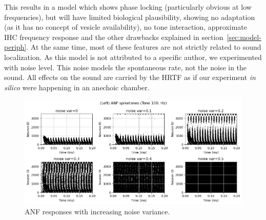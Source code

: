 \documentclass[11pt,a4paper]{article}
\newcommand{\parspace}{\vspace{7pt}}
\begin{document}
\parspace
This results in a model which shows phase locking (particularly obvious at low frequencies), but will have limited biological plausibility, showing no adaptation (as it has no concept of vesicle availability), no tone interaction, approximate IHC frequency response and the other drawbacks explained in section~\ref{sec:model-periph}. At the same time, most of these features are not strictly related to sound localization. As this model is not attributed to a specific author, we experimented with noise level. This noise models the spontaneous rate, not the noise in the sound. All effects on the sound are carried by the HRTF as if our experiment \textit{in silico} were happening in an anechoic chamber.

\begin{figure}[H]
    \centering
    \includegraphics[width=1\linewidth]{Images/gammatone-noise.png}
    \caption{ANF responses with increasing noise variance.}
    \label{fig:anf-noise}
\end{figure}
\end{document}
